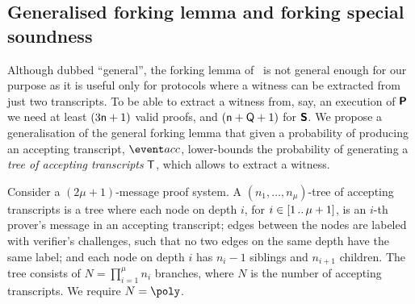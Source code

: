\subsection{Generalised forking lemma and forking special soundness}
Although dubbed ``general'', the forking lemma of~\cite{CCS:BelNev06} is not
general enough for our purpose as it is useful only for protocols where a witness
can be extracted from just two transcripts. To be able to extract a witness
from, say, an execution of $\bm{\mathsf{P}}$ we need at least
$(3 \mathsf{n} + 1)$ valid proofs, and $(\mathsf{n} + \mathsf{Q} + 1)$ for $\bm{\mathsf{S}}$. We
propose a generalisation of the general forking lemma that given a probability of
producing an accepting transcript, $\accProb$, lower-bounds the probability of
generating a \emph{tree of accepting transcripts} $\mathsf{T}$, which allows to
extract a witness.

\begin{definition}
	\label{def:tree_of_accepting_transcripts}
	Consider a $(2\mu + 1)$-message proof system. A $(n_1,
  \ldots, n_\mu)$-tree of accepting transcripts is a tree where each node on
  depth $i$, for $i \in [1 \, .. \, \mu + 1]$, is an $i$-th prover's message in an
  accepting transcript; edges between the nodes are labeled with verifier's
  challenges, such that no two edges on the same depth have the same
  label; and each node on depth $i$ has $n_{i} - 1$ siblings and $n_{i +
    1}$ children. The tree consists of $N = \prod_{i = 1}^\mu n_i$
  branches, where $N$ is the number of accepting transcripts. We require $N = \poly$.
\end{definition}


